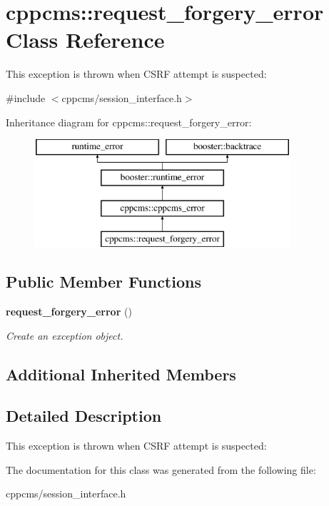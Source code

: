\section{cppcms\-:\-:request\-\_\-forgery\-\_\-error Class Reference}
\label{classcppcms_1_1request__forgery__error}


This exception is thrown when C\-S\-R\-F attempt is suspected\-:  




{\ttfamily \#include $<$cppcms/session\-\_\-interface.\-h$>$}

Inheritance diagram for cppcms\-:\-:request\-\_\-forgery\-\_\-error\-:\begin{figure}[H]
\begin{center}
\leavevmode
\includegraphics[height=4.000000cm]{classcppcms_1_1request__forgery__error}
\end{center}
\end{figure}
\subsection*{Public Member Functions}
\begin{DoxyCompactItemize}
\item 
{\bf request\-\_\-forgery\-\_\-error} ()\label{classcppcms_1_1request__forgery__error_aa9780eb84d19376a1f92e6db320eb902}

\begin{DoxyCompactList}\small\item\em Create an exception object. \end{DoxyCompactList}\end{DoxyCompactItemize}
\subsection*{Additional Inherited Members}


\subsection{Detailed Description}
This exception is thrown when C\-S\-R\-F attempt is suspected\-: 

The documentation for this class was generated from the following file\-:\begin{DoxyCompactItemize}
\item 
cppcms/session\-\_\-interface.\-h\end{DoxyCompactItemize}
